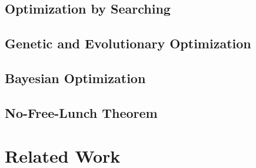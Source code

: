\Blindtext

\subsection{Optimization by Searching}
\label{sec:theory:optimization:search}

\Blindtext

\subsection{Genetic and Evolutionary Optimization}
\label{sec:theory:optimization:genetic}

\Blindtext

\subsection{Bayesian Optimization}
\label{sec:theory:optimization:bayesian}

\Blindtext

\subsection{No-Free-Lunch Theorem}
\label{sec:theory:optimization:lunch}

\Blindtext

\section{Related Work}
\label{sec:theory:related}

\Blindtext
